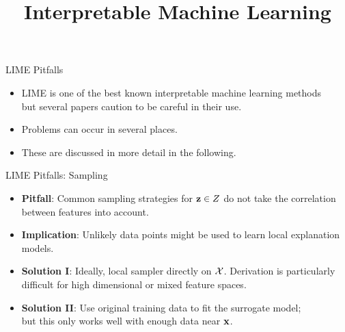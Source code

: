\documentclass[11pt,compress,t,notes=noshow, aspectratio=169, xcolor=table]{beamer}
\title{Interpretable Machine Learning}
\date{}
\begin{document}
	
	
	
	
	
	\newcommand{\titlefigure}{figure/lime5}
    \newcommand{\learninggoals}{
    	\item Learn why LIME should be used with caution
    	\item Possible pitfalls of LIME}
	
	
	


\begin{vbframe}[c]{LIME Pitfalls}
  \begin{itemize}
  	\item LIME is one of the best known interpretable machine learning methods\\ but several papers caution to be careful in their use. 
  	\item Problems can occur in several places. 
  	\item These are discussed in more detail in the following. 
  \end{itemize}
  
\end{vbframe}
  
\begin{vbframe}[c]{LIME Pitfalls: Sampling}
	\begin{itemize}
	  \item \textbf{Pitfall}: Common sampling strategies for $\zv \in Z$ do not take the correlation between features into account. 
      \item \textbf{Implication}:  Unlikely data points might be used to learn local explanation models.
      \item \textbf{Solution I}: Ideally, local sampler directly on $\Xspace$. Derivation is particularly difficult for high dimensional or mixed feature spaces. 
      \item \textbf{Solution II}: Use original training data to fit the surrogate model;\\ but this only works well with enough data near $\xv$.
    \end{itemize}
    
\end{vbframe}
\end{document}
